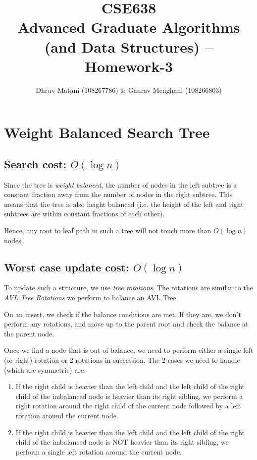 \documentclass{article}
\title{CSE638 \\ Advanced Graduate Algorithms (and Data Structures) -- Homework-3}
\author{Dhruv Matani (108267786) \& Gaurav Menghani (108266803)}
\begin{document}
\maketitle

\clearpage

\tableofcontents

\clearpage

\section{Weight Balanced Search Tree}

\subsection{Search cost: $O(\log{n})$}

Since the tree is \textit{weight balanced}, the number of nodes in the
left subtree is a constant fraction away from the number of nodes in
the right subtree. This means that the tree is also height balanced
(i.e. the height of the left and right subtrees are within constant
fractions of each other).

Hence, any root to leaf path in such a tree will not touch more than
$O(\log{n})$ nodes.

\subsection{Worst case update cost: $O(\log{n})$}

To update such a structure, we use \textit{tree rotations}. The
rotations are similar to the \textit{AVL Tree Rotations} we perform to
balance an AVL Tree.

On an insert, we check if the balance conditions are met. If they are,
we don't perform any rotations, and move up to the parent root and
check the balance at the parent node.

Once we find a node that is out of balance, we need to perform either
a single left (or right) rotation or 2 rotations in succession. The 2
cases we need to handle (which are symmetric) are:

\begin{enumerate}
\item If the right child is heavier than the left child and the left
  child of the right child of the imbalanced node is heavier than its
  right sibling, we perform a right rotation around the right child of
  the current node followed by a left rotation around the current
  node.

\item If the right child is heavier than the left child and the left
  child of the right child of the imbalanced node is NOT heavier than its
  right sibling, we perform a single left rotation around the current
  node.

\end{enumerate}
\end{document}
